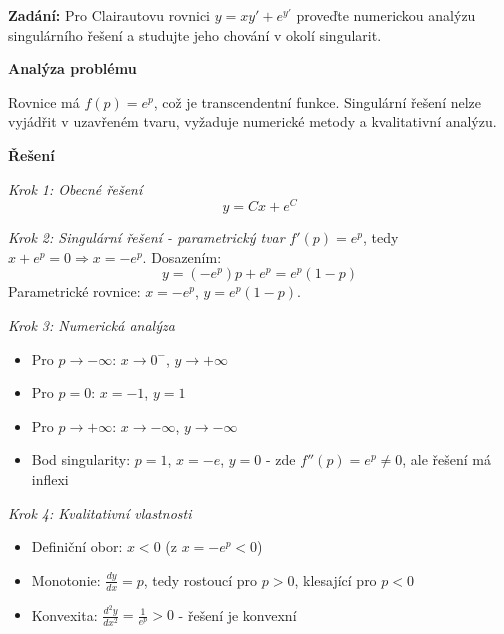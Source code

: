 \begin{example}
\label{ex:numericka-analyza}

\noindent\textbf{Zadání:} Pro Clairautovu rovnici $y = xy' + e^{y'}$ proveďte numerickou analýzu singulárního řešení a studujte jeho chování v okolí singularit.

\vspace{1.5\baselineskip}

\noindent\textbf{Analýza problému}

Rovnice má $f(p) = e^{p}$, což je transcendentní funkce. Singulární řešení nelze vyjádřit v uzavřeném tvaru, vyžaduje numerické metody a kvalitativní analýzu.

\vspace{1.5\baselineskip}

\noindent\textbf{Řešení}

\noindent\textit{Krok 1: Obecné řešení}
\[
y = Cx + e^{C}
\]

\vspace{1\baselineskip}

\noindent\textit{Krok 2: Singulární řešení - parametrický tvar}
$f'(p) = e^{p}$, tedy $x + e^{p} = 0 \Rightarrow x = -e^{p}$. Dosazením:
\[
y = (-e^{p})p + e^{p} = e^{p}(1 - p)
\]
Parametrické rovnice: $x = -e^{p}$, $y = e^{p}(1 - p)$.

\vspace{1\baselineskip}

\noindent\textit{Krok 3: Numerická analýza}
\begin{itemize}
\item Pro $p \to -\infty$: $x \to 0^-$, $y \to +\infty$
\item Pro $p = 0$: $x = -1$, $y = 1$
\item Pro $p \to +\infty$: $x \to -\infty$, $y \to -\infty$
\item Bod singularity: $p = 1$, $x = -e$, $y = 0$ - zde $f''(p) = e^{p} \neq 0$, ale řešení má inflexi
\end{itemize}

\vspace{1\baselineskip}

\noindent\textit{Krok 4: Kvalitativní vlastnosti}
\begin{itemize}
\item Definiční obor: $x < 0$ (z $x = -e^{p} < 0$)
\item Monotonie: $\frac{dy}{dx} = p$, tedy rostoucí pro $p > 0$, klesající pro $p < 0$
\item Konvexita: $\frac{d^2y}{dx^2} = \frac{1}{e^{p}} > 0$ - řešení je konvexní
\end{itemize}


\end{example}
